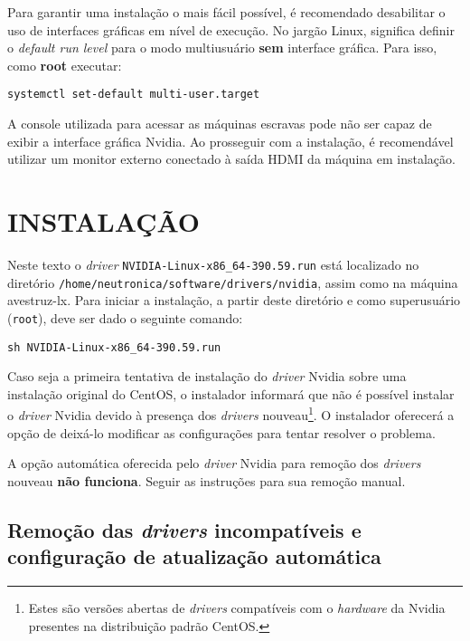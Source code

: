 \documentclass[twoside,a4paper,12pt,english]{inac17}
\begin{document}
Para garantir uma instalação o mais fácil possível, é recomendado 
desabilitar o uso de interfaces gráficas em nível de execução. No 
jargão Linux, significa definir o \textit{default run level} para 
o modo multiusuário \textbf{sem} interface gráfica. Para isso, 
como \textbf{root} executar:

\texttt{systemctl set-default multi-user.target}

\begin{shadedbox}
A console utilizada para acessar as máquinas escravas pode não ser capaz 
de exibir a interface gráfica Nvidia. Ao prosseguir com a instalação, é recomendável 
utilizar um monitor externo conectado à saída HDMI da máquina em instalação.
\end{shadedbox}

\section{INSTALAÇÃO}\label{inst}

Neste texto o \textit{driver} \texttt{NVIDIA-Linux-x86\_64-390.59.run} está localizado no diretório \texttt{/home/neutronica/software/drivers/nvidia}, assim 
como na máquina avestruz-lx. Para iniciar a instalação, a partir 
deste diretório e como superusuário (\texttt{root}), deve ser dado o 
seguinte comando:

\texttt{sh NVIDIA-Linux-x86\_64-390.59.run}

Caso seja a primeira tentativa de instalação do \textit{driver} Nvidia sobre uma 
instalação original do CentOS, o instalador informará que não é possível instalar 
o \textit{driver} Nvidia devido à presença dos \textit{drivers} nouveau\footnote{Estes são versões abertas de \textit{drivers} compatíveis com o \textit{hardware} da Nvidia presentes na distribuição padrão CentOS.}. O instalador 
oferecerá a opção de deixá-lo modificar as configurações para tentar resolver 
o problema. 

\begin{shadedbox}
A opção automática oferecida pelo \textit{driver} Nvidia para remoção dos 
\textit{drivers} nouveau \textbf{não funciona}. Seguir as instruções para sua 
remoção manual.
\end{shadedbox}

\subsection{Remoção das \textit{drivers} incompatíveis e configuração de 
atualização automática}
\end{document}
